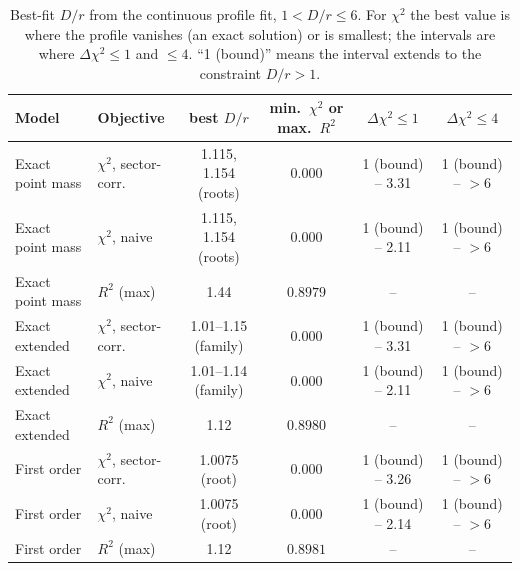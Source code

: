 \documentclass[10pt]{article}
\begin{document}
\begin{table}[!htb]\centering\small
\caption{Best-fit $D/r$ from the continuous profile fit, $1<D/r\le6$. For $\chi^2$ the best value is where the profile vanishes (an exact solution) or is smallest; the intervals are where $\Delta\chi^2\le1$ and $\le4$. ``1 (bound)'' means the interval extends to the constraint $D/r>1$.}\label{tab:bestDr}
\begin{tabular}{llcccc}\toprule
Model & Objective & best $D/r$ & min.\ $\chi^2$ or max.\ $R^2$ & $\Delta\chi^2\le1$ & $\Delta\chi^2\le4$\\\midrule

Exact point mass & $\chi^2$, sector-corr. & 1.115, 1.154 (roots) & $0.000$ & 1 (bound) -- 3.31 & 1 (bound) -- $>6$\\
Exact point mass & $\chi^2$, naive & 1.115, 1.154 (roots) & $0.000$ & 1 (bound) -- 2.11 & 1 (bound) -- $>6$\\
Exact point mass & $R^2$ (max) & 1.44 & $0.8979$ & -- & --\\
\midrule
Exact extended & $\chi^2$, sector-corr. & 1.01--1.15 (family) & $0.000$ & 1 (bound) -- 3.31 & 1 (bound) -- $>6$\\
Exact extended & $\chi^2$, naive & 1.01--1.14 (family) & $0.000$ & 1 (bound) -- 2.11 & 1 (bound) -- $>6$\\
Exact extended & $R^2$ (max) & 1.12 & $0.8980$ & -- & --\\
\midrule
First order & $\chi^2$, sector-corr. & 1.0075 (root) & $0.000$ & 1 (bound) -- 3.26 & 1 (bound) -- $>6$\\
First order & $\chi^2$, naive & 1.0075 (root) & $0.000$ & 1 (bound) -- 2.14 & 1 (bound) -- $>6$\\
First order & $R^2$ (max) & 1.12 & $0.8981$ & -- & --\\
\bottomrule
\end{tabular}
\end{table}
\end{document}
